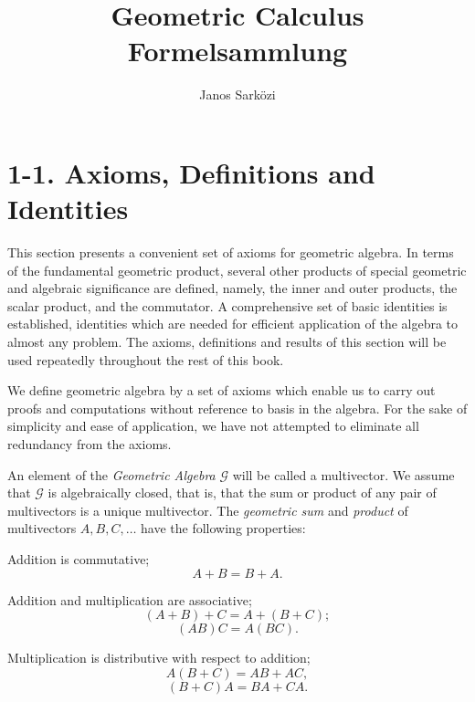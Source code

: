 \documentclass[fleqn]{scrartcl}
\title{Geometric Calculus \\
Formelsammlung}
\author{Janos Sarközi}
\numberwithin{equation}{section}
\begin{document}
\section*{1-1. Axioms, Definitions and Identities}

\noindent This section presents a convenient set of axioms for geometric algebra. In terms of the fundamental geometric product, several other products of special geometric and algebraic significance are defined, namely, the inner and outer products, the scalar product, and the commutator. A comprehensive set of basic identities is established, identities which are needed for efficient application of the algebra to almost any problem. The axioms, definitions and results of this section will be used repeatedly throughout the rest of this book.

\vspace{1em}
\noindent We define geometric algebra by a set of axioms which enable us to carry out proofs and computations without reference to basis in the algebra. For the sake of simplicity and ease of application, we have not attempted to eliminate all redundancy from the axioms.

\vspace{1em}
\noindent An element of the \textit{Geometric Algebra} \(\mathscr{G}\) will be called a multivector. We assume that \(\mathscr{G}\) is algebraically closed, that is, that the sum or product of any pair of multivectors is a unique multivector. The \textit{geometric sum} and \textit{product} of multivectors \(A, B, C, \dots\) have the following properties:

\vspace{1em}
\noindent Addition is commutative;
\begin{equation}
A + B = B + A. \tag{1.1}
\end{equation}

\noindent Addition and multiplication are associative;
\begin{equation}
(A + B) + C = A + (B + C); \tag{1.2}
\end{equation}
\begin{equation}
(AB)C = A(BC). \tag{1.3}
\end{equation}

\noindent Multiplication is distributive with respect to addition;
\begin{equation}
A(B + C) = AB + AC, \tag{1.4}
\end{equation}
\begin{equation}
(B + C)A = BA + CA. \tag{1.5}
\end{equation}
\end{document}
